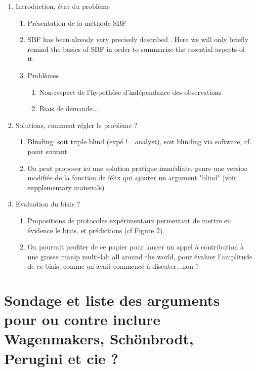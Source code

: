 \documentclass[a4paper,man,natbib,floatsintext]{apa6}
\begin{document}
\renewcommand{\labelenumii}{\Roman{enumii}}
\begin{enumerate}
	\item{Introduction, état du problème}
	\begin{enumerate}
		\item{Présentation de la méthode SBF}
\item SBF has been already very precisely described \cite{schonbrodt_sequential_2017,schonbrodt_bayes_2017}. Here we will only briefly remind the basics of SBF in order to summarize the essential aspects of it.
		\item{Problèmes}
			\begin{enumerate}
            \item{Non-respect de l'hypothèse d'indépendance des observations}
            \item{Biais de demande...}
            \end{enumerate}
            \end{enumerate}
            \item{Solutions, comment régler le problème ?}
            \begin{enumerate}
            \item{Blinding: soit triple blind (expé != analyst), soit blinding via software, cf. point suivant}
            \item{On peut proposer ici une solution pratique immédiate, genre une version modifiée de la fonction de félix qui ajouter un argument "blind" (voir supplementary materials)}
            \end{enumerate}
            \item{Evaluation du biais ?}
            \begin{enumerate}
            \item{Propositions de protocoles expérimentaux permettant de mettre en évidence le biais, et prédictions (cf Figure 2).}
            \item{On pourrait profiter de ce papier pour lancer un appel à contribution à une grosse manip multi-lab all around the world, pour évaluer l'amplitude de ce biais, comme on avait commencé à discuter...non ?}

\end{enumerate}
\end{enumerate}


\section{Sondage et liste des arguments pour ou contre inclure Wagenmakers, Schönbrodt, Perugini et cie ?}
\end{document}
